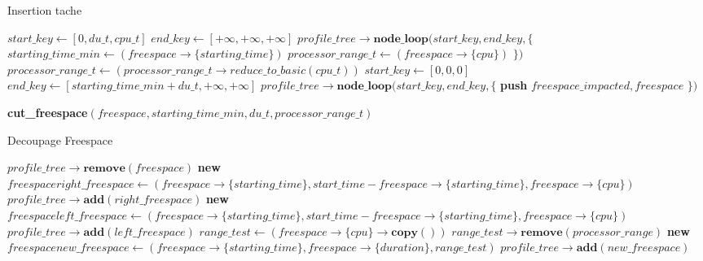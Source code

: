 \documentclass{report}
\begin{document}
\begin{algorithm}
\caption{Insertion tache}\label{insertion}
\begin{algorithmic}[1]
	\State $start\_key\gets[0, du\_t, cpu\_t]$
	\State $end\_key\gets[+\infty, +\infty, +\infty]$
	\State $profile\_tree\rightarrow \textbf{node\_loop}(start\_key, end\_key, \{$
		\State \hspace{\algorithmicindent} $starting\_time\_min\gets (freespace\rightarrow\{starting\_time\})$
		\State \hspace{\algorithmicindent} $processor\_range\_t\gets (freespace\rightarrow\{cpu\})$
		\State \hspace{\algorithmicindent} 
	\State $\})$
	\State {}
	\State $processor\_range\_t\gets (processor\_range\_t\rightarrow reduce\_to\_basic(cpu\_t))$
	\State $start\_key\gets[0, 0, 0]$
	\State $end\_key\gets[starting\_time\_min + du\_t, +\infty, +\infty]$
	\State $profile\_tree\rightarrow \textbf{node\_loop}(start\_key, end\_key, \{$
		\State \hspace{\algorithmicindent} \textbf{push} $freespace\_impacted, freespace$
		\State \hspace{\algorithmicindent} 
	\State $\})$
	
		\State \textbf{cut\_freespace}$(freespace, starting\_time\_min, du\_t, processor\_range\_t)$
	\EndFor
\EndFunction
\end{algorithmic}
\end{algorithm}

\begin{algorithm}
\caption{Decoupage Freespace}\label{cut_freespace}
\begin{algorithmic}[1]
		\State $profile\_tree\rightarrow \textbf{remove}(freespace)$
			\State \textbf{new} $freespace right\_freespace\gets(freespace\rightarrow\{starting\_time\},start\_time - freespace\rightarrow\{starting\_time\}, freespace\rightarrow\{cpu\})$
			\State $profile\_tree\rightarrow \textbf{add}(right\_freespace)$
		\EndIf
			\State \textbf{new} $freespace left\_freespace\gets(freespace\rightarrow\{starting\_time\},start\_time - freespace\rightarrow\{starting\_time\}, freespace\rightarrow\{cpu\})$
			\State $profile\_tree\rightarrow \textbf{add}(left\_freespace)$
		\EndIf
		\State $range\_test \gets (freespace\rightarrow\{cpu\}\rightarrow \textbf{copy}())$
		\State $range\_test\rightarrow \textbf{remove}(processor\_range)$
			\State \textbf{new} $freespace new\_freespace\gets(freespace\rightarrow\{starting\_time\}, freespace\rightarrow\{duration\}, range\_test)$
			\State $profile\_tree\rightarrow \textbf{add}(new\_freespace)$
		\EndIf
	\EndIf
\EndFunction
\end{algorithmic}
\end{algorithm}
\end{document}
